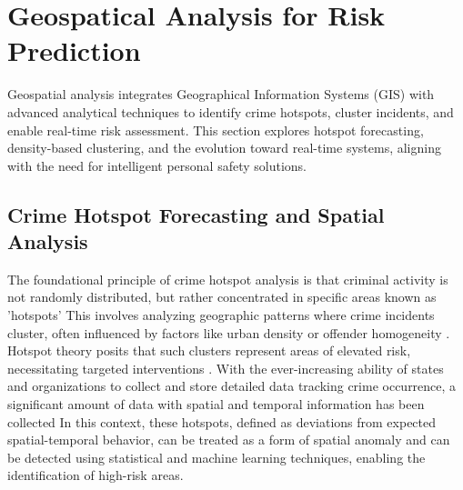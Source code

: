 \documentclass[12pt,a4paper,oneside,english]{book}
\begin{document}
\section{Geospatical Analysis for Risk Prediction}
\label{sec:geospatial_theory}

Geospatial analysis integrates Geographical Information Systems (GIS) with advanced analytical techniques to identify crime hotspots, cluster incidents, and enable real-time risk assessment. This section explores hotspot forecasting, density-based clustering, and the evolution toward real-time systems, aligning with the need for intelligent personal safety solutions.



\subsection{Crime Hotspot Forecasting and Spatial Analysis}



The foundational principle of crime hotspot analysis is that criminal activity is not randomly 
distributed, but rather concentrated in specific areas known as 'hotspots'
This involves analyzing geographic patterns where crime incidents cluster,
often influenced by factors like urban density or offender homogeneity \cite{chen2019exploring}. 
Hotspot theory posits that such clusters represent areas of elevated risk, necessitating targeted interventions  \cite{zhuang2017crime} .
With the ever-increasing ability of states and organizations to collect and store detailed data tracking crime occurrence, a significant amount of data with spatial and temporal information has been collected
In this context, these hotspots, defined as deviations from expected spatial-temporal behavior, can be treated as a form of spatial anomaly and can be detected using statistical and machine learning techniques, enabling the identification of high-risk areas.
\end{document}
